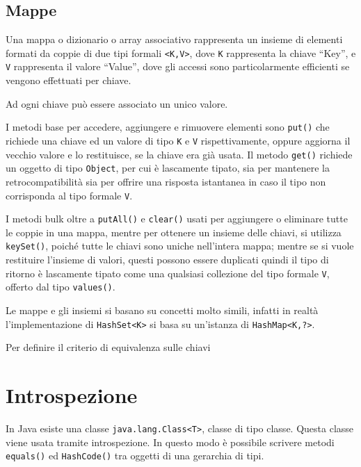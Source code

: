 \documentclass{article}
\numberwithin{equation}{subsection}
\begin{document}
\subsection{Mappe}

Una mappa o dizionario o array associativo rappresenta un insieme di elementi formati da coppie di due tipi formali \verb|<K,V>|, dove \verb|K| rappresenta la chiave ``Key'', 
e \verb|V| rappresenta il valore ``Value'', dove gli accessi sono particolarmente efficienti se vengono effettuati per chiave. 

Ad ogni chiave può essere associato un unico valore. 

I metodi base per accedere, aggiungere e rimuovere elementi sono \verb|put()| che richiede una chiave ed un valore di tipo \verb|K| e \verb|V| rispettivamente, oppure 
aggiorna il vecchio valore e lo restituisce, se la chiave era già usata. 
Il metodo \verb|get()| richiede un oggetto di tipo \verb|Object|, per cui è lascamente tipato, sia per mantenere la retrocompatibilità sia per offrire una risposta istantanea 
in caso il tipo non corrisponda al tipo formale \verb|V|. 


I metodi bulk oltre a \verb|putAll()| e \verb|clear()| usati per aggiungere o eliminare tutte le coppie in una mappa, mentre per ottenere un insieme delle chiavi, si utilizza 
\verb|keySet()|, poiché tutte le chiavi sono uniche nell'intera mappa; mentre se si vuole restituire l'insieme di valori, questi possono essere duplicati quindi il tipo 
di ritorno è lascamente tipato come una qualsiasi collezione del tipo formale \verb|V|, offerto dal tipo \verb|values()|. 

Le mappe e gli insiemi si basano su concetti molto simili, infatti in realtà l'implementazione di \verb|HashSet<K>| si basa su un'istanza di \verb|HashMap<K,?>|. 

Per definire il criterio di equivalenza sulle chiavi 

\clearpage

\section{Introspezione}

In Java esiste una classe \verb|java.lang.Class<T>|, classe di tipo classe. Questa classe viene usata tramite introspezione. 
In questo modo è possibile scrivere metodi \verb|equals()| ed \verb|HashCode()| tra oggetti di una gerarchia di tipi. 
\end{document}
